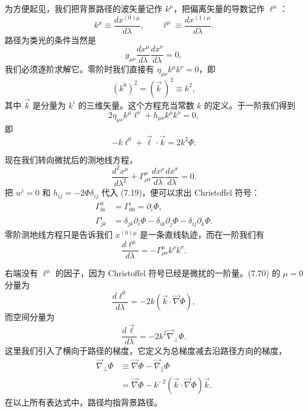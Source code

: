 为方便起见，我们把背景路径的波矢量记作 $k^\mu$，把偏离矢量的导数记作 $\ell^\mu$：
\begin{equation*}
k^\mu \equiv \frac{dx^{(0)\mu}}{d\lambda}, \qquad \ell^\mu \equiv \frac{dx^{(1)\mu}}{d\lambda}.
\tag{7.63}
\end{equation*}
路径为类光的条件当然是
\begin{equation*}
g_{\mu\nu}\frac{dx^\mu}{d\lambda}\frac{dx^\nu}{d\lambda} = 0,
\tag{7.64}
\end{equation*}
我们必须逐阶求解它。零阶时我们直接有 $\eta_{\mu\nu}k^\mu k^\nu = 0$，即
\begin{equation*}
(k^0)^2 = (\vec{k}\,)^2 \equiv k^2,
\tag{7.65}
\end{equation*}
其中 $\vec{k}$ 是分量为 $k^i$ 的三维矢量。这个方程充当常数 $k$ 的定义。于一阶我们得到
\begin{equation*}
2\eta_{\mu\nu}k^\mu\ell^\nu + h_{\mu\nu}k^\mu k^\nu = 0,
\tag{7.66}
\end{equation*}
即
\begin{equation*}
-k\ell^0 + \vec{\ell}\cdot\vec{k} = 2k^2\Phi.
\tag{7.67}
\end{equation*}

现在我们转向微扰后的测地线方程，
\begin{equation*}
\frac{d^2x^\mu}{d\lambda^2} + \Gamma^\mu_{\rho\sigma}\frac{dx^\rho}{d\lambda}\frac{dx^\sigma}{d\lambda} = 0.
\tag{7.68}
\end{equation*}
把 $w^i = 0$ 和 $h_{ij} = -2\Phi\delta_{ij}$ 代入 (7.19)，便可以求出 Christoffel 符号：
\begin{align*}
\Gamma^0_{0i} &= \Gamma^i_{00} = \partial_i\Phi, \\
\Gamma^i_{jk} &= \delta_{jk}\partial_i\Phi - \delta_{ik}\partial_j\Phi - \delta_{ij}\partial_k\Phi.
\tag{7.69}
\end{align*}
零阶测地线方程只是告诉我们 $x^{(0)\mu}$ 是一条直线轨迹，而在一阶我们有
\begin{equation*}
\frac{d\ell^\mu}{d\lambda} = -\Gamma^\mu_{\rho\sigma}k^\rho k^\sigma.
\tag{7.70}
\end{equation*}


右端没有 $\ell^\mu$ 的因子，因为 Christoffel 符号已经是微扰的一阶量。(7.70) 的 $\mu = 0$ 分量为
\begin{equation*}
\frac{d\ell^0}{d\lambda} = -2k(\vec{k}\cdot\vec{\nabla}\Phi),
\tag{7.71}
\end{equation*}
而空间分量为
\begin{equation*}
\frac{d\vec{\ell}}{d\lambda} = -2k^2\vec{\nabla}_{\perp}\Phi.
\tag{7.72}
\end{equation*}
这里我们引入了横向于路径的梯度，它定义为总梯度减去沿路径方向的梯度，
\begin{align*}
\vec{\nabla}_{\perp}\Phi &\equiv \vec{\nabla}\Phi - \vec{\nabla}_{\parallel}\Phi \\
&= \vec{\nabla}\Phi - k^{-2}(\vec{k}\cdot\vec{\nabla}\Phi)\vec{k}.
\tag{7.73}
\end{align*}
在以上所有表达式中，路径均指背景路径。

